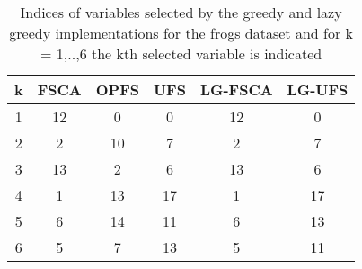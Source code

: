 \begin{table}
	\begin{center}
		\begin{tabular}{c c c c c c}
			k & FSCA & OPFS & UFS & LG-FSCA & LG-UFS \\
			\hline
			1 & 12 & 0 & 0 & 12 & 0 \\
			2 & 2 & 10 & 7 & 2 & 7 \\
			3 & 13 & 2 & 6 & 13 & 6 \\
			4 & 1 & 13 & 17 & 1 & 17 \\
			5 & 6 & 14 & 11 & 6 & 13 \\
			6 & 5 & 7 & 13 & 5 & 11 \\
		\end{tabular}
	\end{center}
	\caption{Indices of variables selected by the greedy and lazy greedy implementations for the frogs dataset and for k = 1,..,6 the kth selected variable is indicated}
\end{table}
